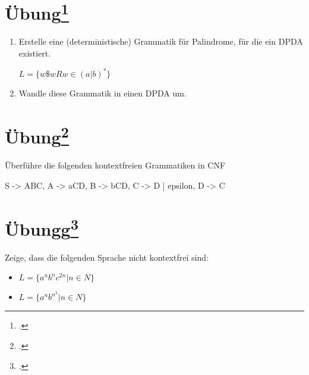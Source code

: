 \documentclass{lehramt-informatik-aufgabe}
\begin{document}
%

\section{Übung\footcite[Seite 34]{theo:fs:2}}

\begin{enumerate}
\item Erstelle eine (deterministische) Grammatik für Palindrome, für die
ein DPDA existiert.

$L = \{ w\$w R w \in (a|b)^* \}$

\item Wandle diese Grammatik in einen DPDA um.
\end{enumerate}

%

\section{Übung\footcite[Seite 37]{theo:fs:2}}

Überführe die folgenden kontextfreien Grammatiken in CNF

\begin{liProduktionsRegeln}
S -> ABC,
A -> aCD,
B -> bCD,
C -> D | epsilon,
D -> C
\end{liProduktionsRegeln}

%

\section{Übungg\footcite[Seite 43]{theo:fs:2}}

Zeige, dass die folgenden Sprache nicht kontextfrei sind:

\begin{itemize}
\item $L = \{ a^n b^n c^{2n} | n \in N \}$
\item $L = \{ a^n b^{n^2} | n \in N \}$
\end{itemize}
\end{document}
